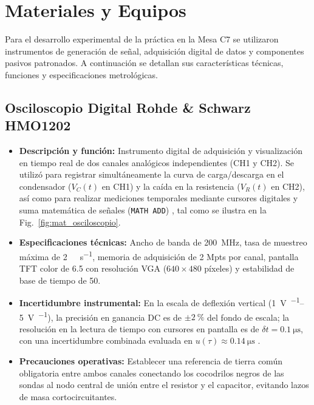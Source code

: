
\section{Materiales y Equipos}
\label{sec:materiales}

Para el desarrollo experimental de la práctica en la Mesa C7 se utilizaron instrumentos de generación de señal, adquisición digital de datos y componentes pasivos patronados. A continuación se detallan sus características técnicas, funciones y especificaciones metrológicas.

\subsection{Osciloscopio Digital Rohde \& Schwarz HMO1202}
\begin{itemize}
    \item \textbf{Descripción y función:} Instrumento digital de adquisición y visualización en tiempo real de dos canales analógicos independientes (CH1 y CH2). Se utilizó para registrar simultáneamente la curva de carga/descarga en el condensador ($V_C(t)$ en CH1) y la caída en la resistencia ($V_R(t)$ en CH2), así como para realizar mediciones temporales mediante cursores digitales y suma matemática de señales (\texttt{MATH ADD}) \cite{hmo1202}, tal como se ilustra en la Fig.~\ref{fig:mat_osciloscopio}.
    \item \textbf{Especificaciones técnicas:} Ancho de banda de \qty{200}{\mega\hertz}, tasa de muestreo máxima de \qty{2}{\giga\sample\per\second}, memoria de adquisición de 2 Mpts por canal, pantalla TFT color de \qty{6,5}{\inch} con resolución VGA ($640 \times 480$ píxeles) y estabilidad de base de tiempo de \qty{50}{\ppm}.
    \item \textbf{Incertidumbre instrumental:} En la escala de deflexión vertical (\qtyrange{1}{5}{\volt\per\division}), la precisión en ganancia DC es de $\pm\qty{2}{\percent}$ del fondo de escala; la resolución en la lectura de tiempo con cursores en pantalla es de $\delta t = \qty{0,1}{\micro\second}$, con una incertidumbre combinada evaluada en $u(\tau) \approx \qty{0,14}{\micro\second}$ \cite{gum}.
    \item \textbf{Precauciones operativas:} Establecer una referencia de tierra común obligatoria entre ambos canales conectando los cocodrilos negros de las sondas al nodo central de unión entre el resistor y el capacitor, evitando lazos de masa cortocircuitantes.
\end{itemize}

